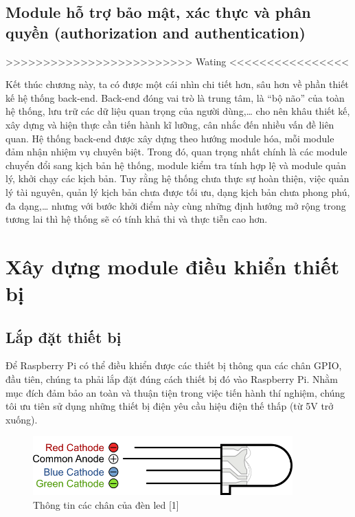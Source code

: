 \documentclass[12pt,a4paper,oneside]{extbook}
\begin{document}
\subsection{Module hỗ trợ bảo mật, xác thực và phân quyền (authorization and authentication)}

>>>>>>>>>>>>>>>>>>>>>>>>> Wating <<<<<<<<<<<<<<<<

Kết thúc chương này, ta có được một cái nhìn chi tiết hơn, sâu hơn về phần thiết kế hệ thống back-end. Back-end đóng vai trò là trung tâm, là “bộ não” của toàn hệ thống, lưu trữ các dữ liệu quan trọng của người dùng,\dots\hspace{0mm} cho nên khâu thiết kế, xây dựng và hiện thực cần tiến hành kĩ lưỡng, cân nhắc đến nhiều vấn đề liên quan. Hệ thống back-end được xây dựng theo hướng module hóa, mỗi module đảm nhận nhiệm vụ chuyên biệt. Trong đó, quan trọng nhất chính là các module chuyển đổi sang kịch bản hệ thống, module kiểm tra tính hợp lệ và module quản lý, khởi chạy các kịch bản. Tuy rằng hệ thống chưa thực sự hoàn thiện, việc quản lý tài nguyên, quản lý kịch bản chưa được tối ưu, dạng kịch bản chưa phong phú, đa dạng,\dots\hspace{0mm} nhưng với bước khởi điểm này cùng những định hướng mở rộng trong tương lai thì hệ thống sẽ có tính khả thi và thực tiễn cao hơn.

\section{Xây dựng module điều khiển thiết bị}
\subsection{Lắp đặt thiết bị}
Để Raspberry Pi có thể điều khiển được các thiết bị thông qua các chân GPIO, đầu tiên, chúng ta phải lắp đặt đúng cách thiết bị đó vào Raspberry Pi. Nhằm mục đích đảm bảo an toàn và thuận tiện trong việc tiến hành thí nghiệm, chúng tôi ưu tiên sử dụng những thiết bị điện yêu cầu hiệu điện thế thấp (từ 5V trở xuống).

\begin{figure}[h]
  \centering
     \includegraphics[width=10cm]{6-rgb-led}
  \caption{Thông tin các chân của đèn led [1]}\label{fig:6-rgb-led}
\end{figure}
\end{document}
